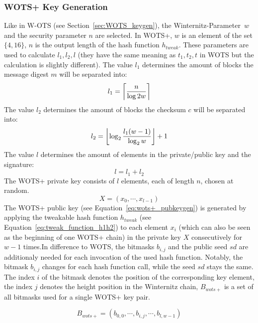 \subsubsection{WOTS+ Key Generation}
\label{sec:wots+_keygen}
Like in W-OTS (see Section~\ref{sec:WOTS_keygen}), the Winternitz-Parameter~$w$ and the security parameter $n$ are selected. In WOTS+, $w$ is an element of the set $\{4, 16\}$, $n$ is the output length of the hash function $h_{tweak}$.
These parameters are used to calculate $l_1, l_2, l$ (they have the same meaning as $t_1, t_2, t$ in WOTS but the calculation is slightly different).
The value $l_1$ determines the amount of blocks the message digest $m$ will be separated into:
\begin{equation}
l_1 = \ceil*{\frac{n}{\log{2}w}}
\end{equation}
The value $l_2$ determines the amount of blocks the checksum $c$ will be separated into: 
\begin{equation}
l_2 = \floor*{\log_{2} \frac{l_1 (w-1)}{\log_{2}w} } +1
\end{equation}
The value $l$ determines the amount of elements in the private/public key and the signature:
\begin{equation}
l = l_1 + l_2
\end{equation}
The WOTS+ private key consists of $l$ elements, each of length $n$, chosen at random.
\begin{equation}
\label{eq:wots+_privkey}
X = (x_0, \cdots, x_{l-1})
\end{equation}
The WOTS+ public key (see Equation~\ref{eq:wots+_pubkeygen}) is generated by applying the tweakable hash function $h_{tweak}$ (see Equation~\ref{eq:tweak_function_h1h2}) to each element $x_i$ (which can also be seen as the beginning of one WOTS+ chain) in the private key $X$ consecutively for $w-1$ times.In difference to WOTS, the bitmasks $b_{i,j}$ and the public seed $sd$ are additionaly needed for each invocation of the used hash function. Notably, the bitmask $b_{i,j}$ changes for each hash function call, while the seed $sd$ stays the same. The index $i$ of the bitmask denotes the position of the corresponding key element, the index $j$ denotes the height position in the Winternitz chain, $B_{wots+}$ is a set of all bitmasks used for a single WOTS+ key pair.

\begin{equation}
\label{eq:wots+_all_bitmasks}
B_{wots+} = (b_{0,0}, \cdots, b_{i,j}, \cdots, b_{l,w-1})
\end{equation}

